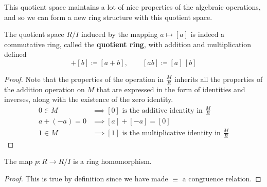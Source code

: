   This quotient space maintains a lot of nice properties of the algebraic operations, and so we can form a new ring structure with this quotient space.  

  \begin{definition}
    The quotient space $R/I$ induced by the mapping $a \mapsto [a]$ is indeed a commutative ring, called the \textbf{quotient ring}, with addition and multiplication defined 
    \begin{equation}
      [a] + [b] \coloneqq [a + b], \qquad [ab] \coloneqq [a] \, [b]
    \end{equation}
  \end{definition}
  \begin{proof}
    Note that the properties of the operation in $\frac{M}{R}$ inherits all the properties of the addition operation on $M$ that are expressed in the form of identities and inverses, along with the existence of the zero identity. 
    \begin{align*}
      0 \in M & \implies [0] \text{ is the additive identity in } \frac{M}{R} \\
      a + (-a) = 0 & \implies [a] + [-a] = [0] \\
      1 \in M & \implies [1] \text{ is the multiplicative identity in } \frac{M}{R}
    \end{align*}
  \end{proof} 

  \begin{theorem}
    The map $p: R \to R/I$ is a ring homomorphism. 
  \end{theorem}
  \begin{proof}
    This is true by definition since we have made $\equiv$ a congruence relation. 
  \end{proof}

